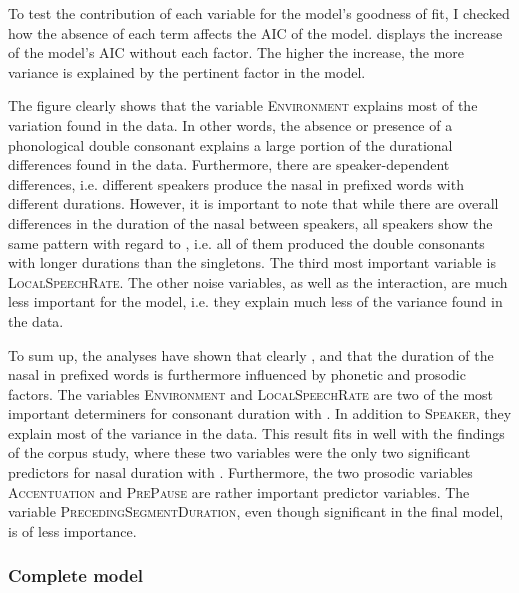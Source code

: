 To test the contribution of each variable for the model's goodness of fit, I checked how the absence of each term affects the AIC of the model.  displays the increase of the model's AIC  without each factor. The higher the increase, the more variance is explained by the pertinent factor in the model.



The figure clearly shows that the variable \textsc{Environment} explains most of the variation found in the data. In other words, the absence or presence of a phonological double consonant explains a large portion of the durational differences found in the data.
Furthermore, there are speaker-dependent differences, i.e. different speakers produce the nasal in prefixed words with different durations. However, it is important to note that while there are overall differences in the duration of the nasal between speakers, all speakers show the same pattern with regard to , i.e. all of them produced the double consonants with longer durations than the singletons. 
The third most important variable is \textsc{LocalSpeechRate}. The other noise variables, as well as the interaction, are much less important for the model, i.e. they explain much less of the variance found in the data.


To sum up, the analyses have shown that  clearly , and that the duration of the nasal in prefixed words is furthermore influenced by phonetic and prosodic factors.
The variables \textsc{Environment} and \textsc{LocalSpeechRate} are two of the most important determiners for consonant duration with . In addition to \textsc{Speaker}, they explain most of the variance in the data. This result fits in well with the findings of the corpus study, where these two variables were the only two significant predictors for nasal duration with . 
Furthermore, the two prosodic variables \textsc{Accentuation} and \textsc{PrePause} are rather important predictor variables. The variable \textsc{PrecedingSegmentDuration}, even though significant in the final model, is of less importance. 



\subsubsection{Complete model}

